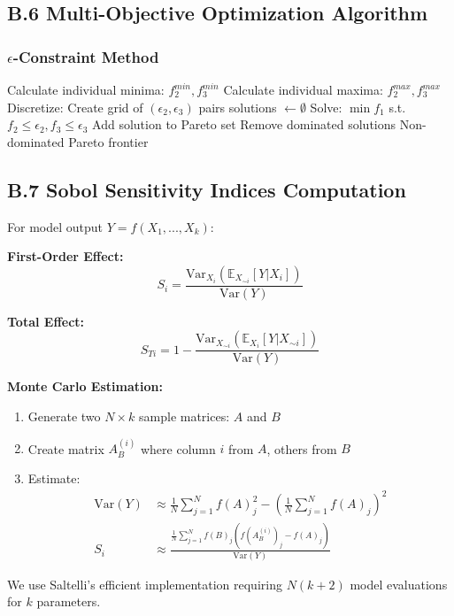 \subsection{B.6 Multi-Objective Optimization Algorithm}

\subsubsection{$\epsilon$-Constraint Method}

\begin{algorithmic}[1]
\STATE Calculate individual minima: $f_2^{min}, f_3^{min}$
\STATE Calculate individual maxima: $f_2^{max}, f_3^{max}$
\STATE Discretize: Create grid of $(\epsilon_2, \epsilon_3)$ pairs
\STATE solutions $\leftarrow \emptyset$
\STATE Solve: $\min f_1$ s.t. $f_2 \leq \epsilon_2, f_3 \leq \epsilon_3$
\STATE Add solution to Pareto set
\ENDIF
\ENDFOR
\STATE Remove dominated solutions
\RETURN Non-dominated Pareto frontier
\ENDPROCEDURE
\end{algorithmic}

\subsection{B.7 Sobol Sensitivity Indices Computation}

For model output $Y = f(X_1, ..., X_k)$:

\textbf{First-Order Effect:}
\begin{equation}
S_i = \frac{\text{Var}_{X_i}(\mathbb{E}_{X_{\sim i}}[Y|X_i])}{\text{Var}(Y)}
\end{equation}

\textbf{Total Effect:}
\begin{equation}
S_{Ti} = 1 - \frac{\text{Var}_{X_{\sim i}}(\mathbb{E}_{X_i}[Y|X_{\sim i}])}{\text{Var}(Y)}
\end{equation}

\textbf{Monte Carlo Estimation:}
\begin{enumerate}
\item Generate two $N \times k$ sample matrices: $A$ and $B$
\item Create matrix $A_B^{(i)}$ where column $i$ from $A$, others from $B$
\item Estimate:
\begin{align*}
\text{Var}(Y) &\approx \frac{1}{N}\sum_{j=1}^N f(A)_j^2 - \left(\frac{1}{N}\sum_{j=1}^N f(A)_j\right)^2 \\
S_i &\approx \frac{\frac{1}{N}\sum_{j=1}^N f(B)_j(f(A_B^{(i)})_j - f(A)_j)}{\text{Var}(Y)}
\end{align*}
\end{enumerate}

We use Saltelli's efficient implementation requiring $N(k+2)$ model evaluations for $k$ parameters.
